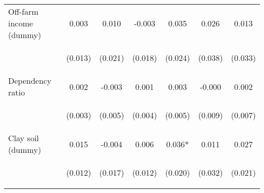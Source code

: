 \begin{center}
\begin{tabular}{lcccccc}
Off-farm income (dummy) & 0.003 & 0.010 & -0.003 & 0.035 & 0.026 & 0.013 \\
\vspace{4pt} & \begin{footnotesize}(0.013)\end{footnotesize} & \begin{footnotesize}(0.021)\end{footnotesize} & \begin{footnotesize}(0.018)\end{footnotesize} & \begin{footnotesize}(0.024)\end{footnotesize} & \begin{footnotesize}(0.038)\end{footnotesize} & \begin{footnotesize}(0.033)\end{footnotesize} \\
Dependency ratio & 0.002 & -0.003 & 0.001 & 0.003 & -0.000 & 0.002 \\
\vspace{4pt} & \begin{footnotesize}(0.003)\end{footnotesize} & \begin{footnotesize}(0.005)\end{footnotesize} & \begin{footnotesize}(0.004)\end{footnotesize} & \begin{footnotesize}(0.005)\end{footnotesize} & \begin{footnotesize}(0.009)\end{footnotesize} & \begin{footnotesize}(0.007)\end{footnotesize} \\
Clay soil (dummy) & 0.015 & -0.004 & 0.006 & 0.036* & 0.011 & 0.027 \\
\vspace{4pt} & \begin{footnotesize}(0.012)\end{footnotesize} & \begin{footnotesize}(0.017)\end{footnotesize} & \begin{footnotesize}(0.012)\end{footnotesize} & \begin{footnotesize}(0.020)\end{footnotesize} & \begin{footnotesize}(0.032)\end{footnotesize} & \begin{footnotesize}(0.021)\end{footnotesize} \\

\end{tabular}
\end{center}
